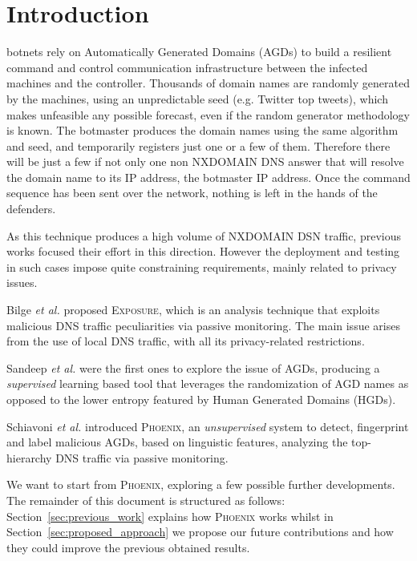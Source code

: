
\section{Introduction}
\label{sec:introduction}
 botnets rely on Automatically Generated Domains (AGDs) to build a resilient
command and control communication infrastructure between the infected machines and the controller.
Thousands of domain names are randomly generated by the machines, using an unpredictable seed (e.g.
Twitter top tweets), which makes unfeasible any possible forecast, even if the
random generator methodology is known.
The botmaster produces the domain names using the same algorithm and seed,
and temporarily registers just one or a few of them. Therefore there will be just a few if not
only one non NXDOMAIN DNS answer that will resolve the domain name to its IP address, the
botmaster IP address. Once the command sequence has been sent over the network, nothing is left in
the hands of the defenders.

As this technique produces a high volume of NXDOMAIN DSN traffic, previous works
focused their effort in this direction. However the deployment and testing in such
cases impose quite constraining requirements, mainly related to privacy issues.

Bilge \emph{et al.} \cite{Exposure} proposed \textsc{Exposure}, which is an analysis
technique that exploits malicious DNS traffic peculiarities via passive monitoring. The main
issue arises from the use of local DNS traffic, with all its privacy-related restrictions.

Sandeep \emph{et al.}\cite{Sandeep2010} were the first ones to explore the issue of AGDs,
producing a \emph{supervised} learning based tool that leverages the randomization of AGD names as opposed
to the lower entropy featured by Human Generated Domains (HGDs).

Schiavoni \emph{et al.}\cite{Lorenzo2013} introduced \textsc{Phoenix}, an \emph{unsupervised}
system to detect, fingerprint and label malicious AGDs, based on linguistic features,
analyzing the top-hierarchy DNS traffic via passive monitoring.

We want to start from \textsc{Phoenix}, exploring a few possible further developments.
The remainder of this document is structured as follows: Section~\ref{sec:previous_work}
explains how \textsc{Phoenix} works whilst in Section~\ref{sec:proposed_approach} we
propose our future contributions and how they could improve the previous obtained results.


